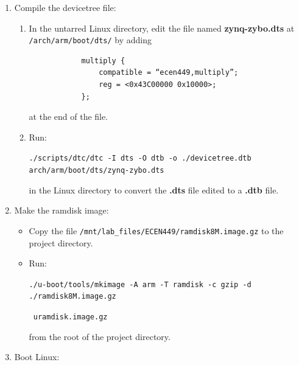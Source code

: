\documentclass[11pt,letterpaper,titlepage]{article}
\begin{document}
\begin{enumerate}
\begin{enumerate}
    \end{enumerate}
    
    \item Compile the devicetree file:
    
    \begin{enumerate}
        
        \item In the untarred Linux directory, edit the file named \textbf{zynq-zybo.dts} at \verb|/arch/arm/boot/dts/| by adding
        
        \begin{verbatim}
            multiply {
                compatible = “ecen449,multiply”;
                reg = <0x43C00000 0x10000>;
            };
        \end{verbatim}
        
       at the end of the file.
       
       \item Run:
       
       \verb|./scripts/dtc/dtc -I dts -O dtb -o ./devicetree.dtb arch/arm/boot/dts/zynq-zybo.dts|
       
       in the Linux directory to convert the \textbf{.dts} file edited to a \textbf{.dtb} file.
        
    \end{enumerate}
    
    \item Make the ramdisk image:
    
    \begin{itemize}
        
        \item Copy the file \verb|/mnt/lab_files/ECEN449/ramdisk8M.image.gz| to the project directory.
        
        \item Run:
        
        \verb|./u-boot/tools/mkimage -A arm -T ramdisk -c gzip -d ./ramdisk8M.image.gz|
        
        \verb| uramdisk.image.gz|
        
        from the root of the project directory.
        
    \end{itemize}
    
    \item Boot Linux:
    
    \begin{enumerate}
        

\end{enumerate}
\end{enumerate}
\end{document}
